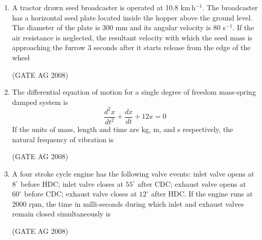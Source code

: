 \documentclass[journal,12pt,onecolumn]{IEEEtran}
\begin{document}
\begin{enumerate}
\medskip

\item 
 A tractor drawn seed broadcaster is operated at 10.8 km\,h$^{-1}$. The broadcaster has a horizontal seed plate located inside the hopper above the ground level. The diameter of the plate is 300 mm and its angular velocity is 80 s$^{-1}$. If the air resistance is neglected, the resultant velocity with which the seed mass is approaching the furrow 3 seconds after it starts release from the edge of the wheel
\begin{enumerate}
\end{enumerate}
\hfill(GATE AG 2008)\\

\medskip

\item 
 The differential equation of motion for a single degree of freedom mass-spring damped system is
\[
\frac{d^2 x}{dt^2} + \frac{d x}{dt} + 12 x = 0
\]
If the units of mass, length and time are kg, m, and s respectively, the natural frequency of vibration is
\begin{enumerate}
\end{enumerate}
\hfill(GATE AG 2008)\\

\medskip

\item 
 A four stroke cycle engine has the following valve events: inlet valve opens at $8^\circ$ before HDC; inlet valve closes at $55^\circ$ after CDC; exhaust valve opens at $60^\circ$ before CDC; exhaust valve closes at $12^\circ$ after HDC. If the engine runs at 2000 rpm, the time in milli-seconds during which inlet and exhaust valves remain closed simultaneously is
\begin{enumerate}
\end{enumerate}
\hfill(GATE AG 2008)\\


\end{enumerate}
\end{document}
